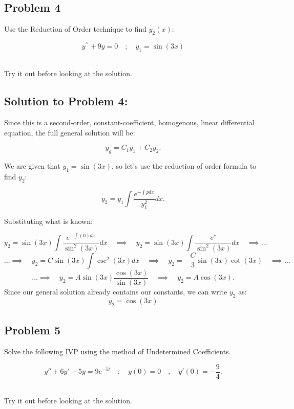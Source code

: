 \documentclass[a4paper,12pt]{article} %
\begin{document}
\pagebreak

\subsection*{Problem 4}

Use the Reduction of Order technique to find $y_2(x)$:

$$ y^{\prime \prime}+9 y=0 \quad;\quad y_1=\sin{(3x)} $$\

Try it out before looking at the solution.

\pagebreak

\subsection*{Solution to Problem 4:}

Since this is a second-order, constant-coefficient, homogenous, linear differential equation, the full general solution will be:

$$ y_g = C_1y_1 + C_2y_2. $$

We are given that $y_1 = \sin{(3x)}$, so let's use the reduction of order formula to find $y_2$:

$$ y_2=y_1 \int \frac{e^{-\int p d x}}{y_1^2} d x. $$


Substituting what is known:

$$ y_2 = \sin{(3x)} \int \frac{e^{-\int (0)dx}}{\sin^2{(3x)}}dx \quad\implies\quad y_2 = \sin{(3x)} \int \frac{e^c}{\sin^2{(3x)}}dx \quad\implies\ldots $$
$$\ldots\implies\quad y_2 = C\sin{(3x)}\int \csc^{2}{(3x)} dx \quad\implies\quad y_2 = -\frac{C}{3}\sin{(3x)}\cot{(3x)} \quad\implies\ldots $$
$$ \ldots\implies\quad y_2 = A\sin{(3x)}\frac{\cos{(3x)}}{\sin{(3x)}} \quad\implies\quad y_2=A\cos{(3x)}. $$
Since our general solution already contains our constants, we can write $y_2$ as:
$$ \underline{\boxed{y_2 = \cos{(3x)}}} $$

\pagebreak

\subsection*{Problem 5}

Solve the following IVP using the method of Undetermined Coefficients.

$$ y'' + 6y' + 5y = 9e^{-5t} \quad:\quad y(0)=0\quad,\quad y'(0)=-\frac{9}{4}.
$$\

Try it out before looking at the solution.

\pagebreak
\end{document}
